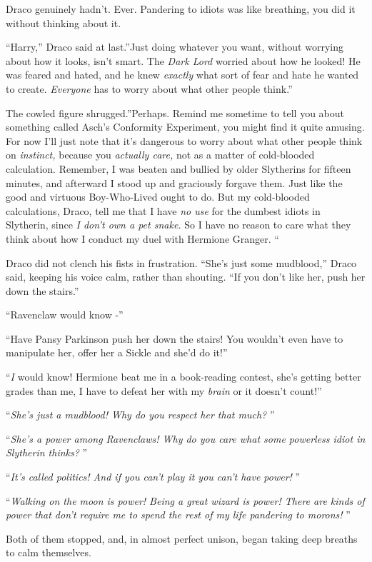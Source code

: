 Draco genuinely hadn't. Ever. Pandering to idiots was like breathing,
you did it without thinking about it.

``Harry,'' Draco said at last.''Just doing whatever you want, without
worrying about how it looks, isn't smart. The \emph{Dark Lord} worried
about how he looked! He was feared and hated, and he knew \emph{exactly}
what sort of fear and hate he wanted to create. \emph{Everyone} has to
worry about what other people think.''

The cowled figure shrugged.''Perhaps. Remind me sometime to tell you
about something called Asch's Conformity Experiment, you might find it
quite amusing. For now I'll just note that it's dangerous to worry about
what other people think on \emph{instinct,} because you \emph{actually
care,} not as a matter of cold-blooded calculation. Remember, I was
beaten and bullied by older Slytherins for fifteen minutes, and
afterward I stood up and graciously forgave them. Just like the good and
virtuous Boy-Who-Lived ought to do. But my cold-blooded calculations,
Draco, tell me that I have \emph{no use} for the dumbest idiots in
Slytherin, since \emph{I don't own a pet snake.} So I have no reason to
care what they think about how I conduct my duel with Hermione Granger.
``

Draco did not clench his fists in frustration. ``She's just some
mudblood,'' Draco said, keeping his voice calm, rather than shouting.
``If you don't like her, push her down the stairs.''

``Ravenclaw would know -''

``Have Pansy Parkinson push her down the stairs! You wouldn't even have
to manipulate her, offer her a Sickle and she'd do it!''

``\emph{I} would know! Hermione beat me in a book-reading contest, she's
getting better grades than me, I have to defeat her with my \emph{brain}
or it doesn't count!''

``\emph{She's just a mudblood! Why do you respect her that much?} ''

``\emph{She's a power among Ravenclaws! Why do you care what some
powerless idiot in Slytherin thinks?} ''

``\emph{It's called politics! And if you can't play it you can't have
power!} ''

``\emph{Walking on the moon is power! Being a great wizard is power!
There are kinds of power that don't require me to spend the rest of my
life pandering to morons!} ''

Both of them stopped, and, in almost perfect unison, began taking deep
breaths to calm themselves.

